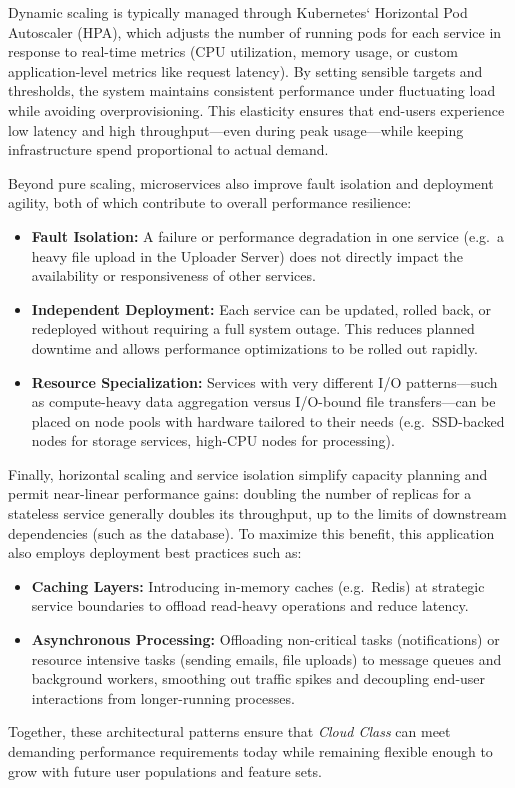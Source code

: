 Dynamic scaling is typically managed through Kubernetes` Horizontal Pod Autoscaler (HPA), which adjusts the number of running pods for each service in response to real-time metrics (CPU utilization, memory usage, or custom application-level metrics like request latency).  By setting sensible targets and thresholds, the system maintains consistent performance under fluctuating load while avoiding overprovisioning.  This elasticity ensures that end-users experience low latency and high throughput—even during peak usage—while keeping infrastructure spend proportional to actual demand.

Beyond pure scaling, microservices also improve fault isolation and deployment agility, both of which contribute to overall performance resilience:

\begin{itemize}
  \item \textbf{Fault Isolation:}  A failure or performance degradation in one service (e.g.\ a heavy file upload in the Uploader Server) does not directly impact the availability or responsiveness of other services.
  \item \textbf{Independent Deployment:}  Each service can be updated, rolled back, or redeployed without requiring a full system outage.  This reduces planned downtime and allows performance optimizations to be rolled out rapidly.
  \item \textbf{Resource Specialization:}  Services with very different I/O patterns—such as compute-heavy data aggregation versus I/O-bound file transfers—can be placed on node pools with hardware tailored to their needs (e.g.\ SSD-backed nodes for storage services, high-CPU nodes for processing).
\end{itemize}

Finally, horizontal scaling and service isolation simplify capacity planning and permit near-linear performance gains: doubling the number of replicas for a stateless service generally doubles its throughput, up to the limits of downstream dependencies (such as the database).  To maximize this benefit, this application also employs deployment best practices such as:

\begin{itemize}
  \item \textbf{Caching Layers:} Introducing in-memory caches (e.g.\ Redis) at strategic service boundaries to offload read-heavy operations and reduce latency.
  \item \textbf{Asynchronous Processing:} Offloading non-critical tasks (notifications) or resource intensive tasks (sending emails, file uploads) to message queues and background workers, smoothing out traffic spikes and decoupling end-user interactions from longer-running processes.
\end{itemize}

Together, these architectural patterns ensure that \emph{Cloud Class} can meet demanding performance requirements today while remaining flexible enough to grow with future user populations and feature sets.
